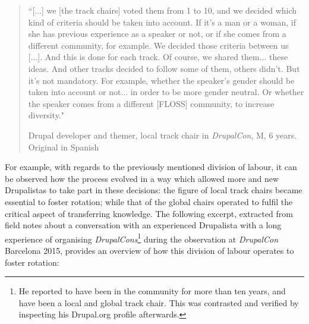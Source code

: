 \begin{quotation}
``[...] we [the track chairs] voted them from 1 to 10, and we decided which kind of criteria should be taken into account. If it's a man or a woman, if she has previous experience as a speaker or not, or if she comes from a different community, for example. We decided those criteria between us [...]. And this is done for each track. Of course, we shared them... these ideas. And other tracks decided to follow some of them, others didn't. But it's not mandatory. For example, whether the speaker's gender should be taken into account or not... in order to be more gender neutral. Or whether the speaker comes from a different [FLOSS] community, to increase diversity."

\begin{flushright}\footnotesize{Drupal developer and themer, local track chair in \textit{DrupalCon}, M, 6 years. Original in Spanish}\end{flushright}
\end{quotation}

For example, with regards to the previously mentioned division of labour, it can be observed how the process evolved in a way which allowed more and new Drupalistas to take part in these decisions: the figure of local track chairs became essential to foster rotation; while that of the global chairs operated to fulfil the critical aspect of transferring knowledge. The following excerpt, extracted from field notes about a conversation with an experienced Drupalista with a long experience of organising \textit{DrupalCons}\footnote{He reported to have been in the community for more than ten years, and have been a local and global track chair. This was contrasted and verified by inspecting his Drupal.org profile afterwards.} during the observation at \textit{DrupalCon} Barcelona 2015, provides an overview of how this division of labour operates to foster rotation:

